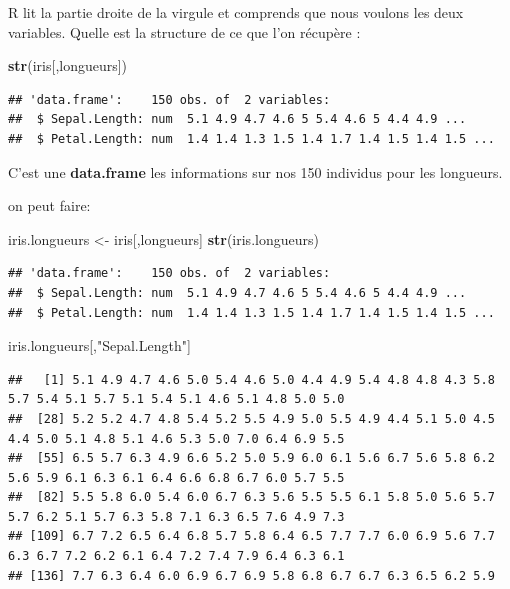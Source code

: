 \documentclass[
]{book}
\newenvironment{Shaded}{\begin{snugshade}}{\end{snugshade}}
\newcommand{\FunctionTok}[1]{\textcolor[rgb]{0.13,0.29,0.53}{\textbf{#1}}}
\newcommand{\NormalTok}[1]{#1}
\newcommand{\OtherTok}[1]{\textcolor[rgb]{0.56,0.35,0.01}{#1}}
\newcommand{\StringTok}[1]{\textcolor[rgb]{0.31,0.60,0.02}{#1}}
\begin{document}
R lit la partie droite de la virgule et comprends que nous voulons les deux variables.
Quelle est la structure de ce que l'on récupère :

\begin{Shaded}
\begin{Highlighting}[]
\FunctionTok{str}\NormalTok{(iris[,longueurs])}
\end{Highlighting}
\end{Shaded}

\begin{verbatim}
## 'data.frame':    150 obs. of  2 variables:
##  $ Sepal.Length: num  5.1 4.9 4.7 4.6 5 5.4 4.6 5 4.4 4.9 ...
##  $ Petal.Length: num  1.4 1.4 1.3 1.5 1.4 1.7 1.4 1.5 1.4 1.5 ...
\end{verbatim}

C'est une \textbf{data.frame} les informations sur nos 150 individus pour les longueurs.

on peut faire:

\begin{Shaded}
\begin{Highlighting}[]
\NormalTok{iris.longueurs }\OtherTok{\textless{}{-}}\NormalTok{ iris[,longueurs]}
\FunctionTok{str}\NormalTok{(iris.longueurs)}
\end{Highlighting}
\end{Shaded}

\begin{verbatim}
## 'data.frame':    150 obs. of  2 variables:
##  $ Sepal.Length: num  5.1 4.9 4.7 4.6 5 5.4 4.6 5 4.4 4.9 ...
##  $ Petal.Length: num  1.4 1.4 1.3 1.5 1.4 1.7 1.4 1.5 1.4 1.5 ...
\end{verbatim}

\begin{Shaded}
\begin{Highlighting}[]
\NormalTok{iris.longueurs[,}\StringTok{"Sepal.Length"}\NormalTok{]}
\end{Highlighting}
\end{Shaded}

\begin{verbatim}
##   [1] 5.1 4.9 4.7 4.6 5.0 5.4 4.6 5.0 4.4 4.9 5.4 4.8 4.8 4.3 5.8 5.7 5.4 5.1 5.7 5.1 5.4 5.1 4.6 5.1 4.8 5.0 5.0
##  [28] 5.2 5.2 4.7 4.8 5.4 5.2 5.5 4.9 5.0 5.5 4.9 4.4 5.1 5.0 4.5 4.4 5.0 5.1 4.8 5.1 4.6 5.3 5.0 7.0 6.4 6.9 5.5
##  [55] 6.5 5.7 6.3 4.9 6.6 5.2 5.0 5.9 6.0 6.1 5.6 6.7 5.6 5.8 6.2 5.6 5.9 6.1 6.3 6.1 6.4 6.6 6.8 6.7 6.0 5.7 5.5
##  [82] 5.5 5.8 6.0 5.4 6.0 6.7 6.3 5.6 5.5 5.5 6.1 5.8 5.0 5.6 5.7 5.7 6.2 5.1 5.7 6.3 5.8 7.1 6.3 6.5 7.6 4.9 7.3
## [109] 6.7 7.2 6.5 6.4 6.8 5.7 5.8 6.4 6.5 7.7 7.7 6.0 6.9 5.6 7.7 6.3 6.7 7.2 6.2 6.1 6.4 7.2 7.4 7.9 6.4 6.3 6.1
## [136] 7.7 6.3 6.4 6.0 6.9 6.7 6.9 5.8 6.8 6.7 6.7 6.3 6.5 6.2 5.9
\end{verbatim}
\end{document}
